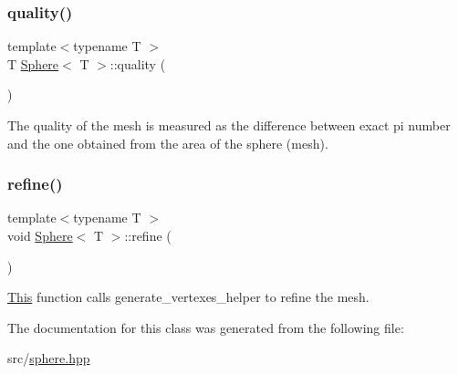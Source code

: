 \mbox{\label{classSphere_a9ebc65dabaf8d87fbe599f4b64816f73}} 
\subsubsection{\texorpdfstring{quality()}{quality()}}
{\footnotesize\ttfamily template$<$typename T $>$ \\
T \mbox{\hyperlink{classSphere}{Sphere}}$<$ T $>$\+::quality (\begin{DoxyParamCaption}{ }\end{DoxyParamCaption})}



The quality of the mesh is measured as the difference between exact pi number and the one obtained from the area of the sphere (mesh). 

\mbox{\label{classSphere_a3f5ee2b07e48a360696fe983690d1d1f}} 
\subsubsection{\texorpdfstring{refine()}{refine()}}
{\footnotesize\ttfamily template$<$typename T $>$ \\
void \mbox{\hyperlink{classSphere}{Sphere}}$<$ T $>$\+::refine (\begin{DoxyParamCaption}{ }\end{DoxyParamCaption})}



\mbox{\hyperlink{classThis}{This}} function calls generate\+\_\+vertexes\+\_\+helper to refine the mesh. 



The documentation for this class was generated from the following file\+:\begin{DoxyCompactItemize}
\item 
src/\mbox{\hyperlink{sphere_8hpp}{sphere.\+hpp}}\end{DoxyCompactItemize}
